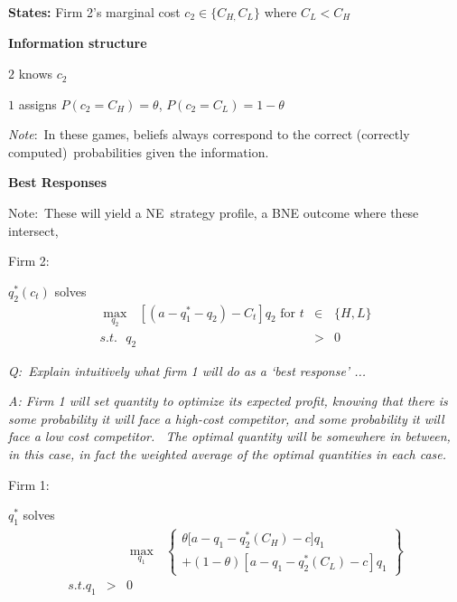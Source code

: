 \documentclass{article}
\begin{document}
\bigskip

\textbf{States: }Firm 2's marginal cost $c_{2}\in \{C_{H,}C_{L}\}$ where $%
C_{L}<C_{H}$

\bigskip

\textbf{Information structure }

$2$ knows $c_{2}$ 

$1$ assigns $P(c_{2}=C_{H})=\theta $, $P(c_{2}=C_{L})=1-\theta $

\bigskip

\textit{Note}:\ In these games, beliefs always correspond to the correct
(correctly computed)\ probabilities given the information.

\bigskip 

\textbf{Best Responses }

Note:\ These will yield a NE\ strategy profile, a BNE outcome where these
intersect,

Firm 2:

$q_{2}^{\ast }(c_{t})$ solves 
\begin{eqnarray*}
\max_{q_{2}}\text{ }[(a-q_{1}^{\ast }-q_{2})-C_{t}]q_{2}\text{ for }t &\in
&\{H,L\} \\
s.t.\text{ }q_{2} &>&0
\end{eqnarray*}

\bigskip

\textit{Q:\ }\bigskip \textit{Explain intuitively what firm 1 will do as a
`best response' ...}

\bigskip

\textit{A: Firm 1 will set quantity to optimize its expected profit, knowing
that there is some probability it will face a high-cost competitor, and some
probability it will face a low cost competitor. \ The optimal quantity will
be somewhere in between, in this case, in fact the weighted average of the
optimal quantities in each case.}

\bigskip

Firm 1:

$q_{1}^{\ast }$ solves 
\begin{eqnarray*}
&&\max_{q_{1}}\text{ }\left\{ 
\begin{array}{c}
\theta \lbrack a-q_{1}-q_{2}^{\ast }(C_{H})-c]q_{1}\text{ } \\ 
+(1-\theta )[a-q_{1}-q_{2}^{\ast }(C_{L})-c]q_{1}%
\end{array}%
\right\}  \\
s.t.q_{1} &>&0
\end{eqnarray*}

\bigskip
\end{document}
